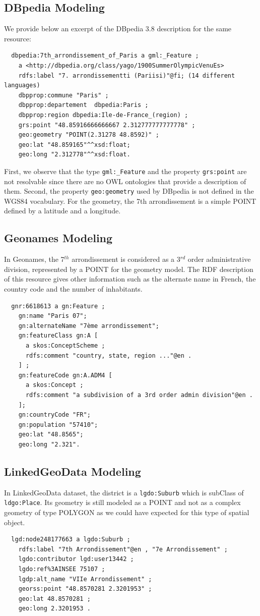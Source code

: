 \subsection{DBpedia Modeling}
We provide below an excerpt of the DBpedia 3.8 description for the same resource:
{\small
\begin{verbatim}
  dbpedia:7th_arrondissement_of_Paris a gml:_Feature ;
    a <http://dbpedia.org/class/yago/1900SummerOlympicVenuEs>
    rdfs:label "7. arrondissementti (Pariisi)"@fi; (14 different languages)
    dbpprop:commune "Paris" ;
    dbpprop:departement  dbpedia:Paris ;
    dbpprop:region dbpedia:Ile-de-France_(region) ;
    grs:point "48.85916666666667 2.312777777777778" ;
    geo:geometry "POINT(2.31278 48.8592)" ;
    geo:lat "48.859165"^^xsd:float;
    geo:long "2.312778"^^xsd:float.
\end{verbatim}
}
First, we observe that the type \texttt{gml:\_Feature} and the property \texttt{grs:point} are not resolvable since there are no OWL ontologies that provide a description of them. Second, the property \texttt{geo:geometry} used by DBpedia is not defined in the WGS84 vocabulary. For the geometry, the 7th arrondissement is a simple POINT defined by a latitude and a longitude.

\subsection{Geonames Modeling}
In Geonames, the 7$^{th}$ arrondissement is considered as a 3$^{rd}$ order administrative division, represented by a POINT for the geometry model. The RDF description of this resource gives other information such as the alternate name in French, the country code and the number of inhabitants.
{\small
\begin{verbatim}
  gnr:6618613 a gn:Feature ;
    gn:name "Paris 07";
    gn:alternateName "7ème arrondissement";
    gn:featureClass gn:A [
      a skos:ConceptScheme ;
      rdfs:comment "country, state, region ..."@en .
    ] ;
    gn:featureCode gn:A.ADM4 [
      a skos:Concept ;
      rdfs:comment "a subdivision of a 3rd order admin division"@en .
    ];
    gn:countryCode "FR";
    gn:population "57410";
    geo:lat "48.8565";
    geo:long "2.321".
\end{verbatim}
}

\subsection{LinkedGeoData Modeling}
In LinkedGeoData dataset, the district is a \texttt{lgdo:Suburb} which is  subClass of \texttt{ldgo:Place}. Its geometry is still modeled as a POINT and not as a complex geometry of type POLYGON as we could have expected for this type of spatial object.
{\small
\begin{verbatim}
  lgd:node248177663 a lgdo:Suburb ;
    rdfs:label "7th Arrondissement"@en , "7e Arrondissement" ;
    lgdo:contributor lgd:user13442 ;
    lgdo:ref%3AINSEE 75107 ;
    lgdp:alt_name "VIIe Arrondissement" ;
    georss:point "48.8570281 2.3201953" ;
    geo:lat 48.8570281 ;
    geo:long 2.3201953 .
\end{verbatim}
}

